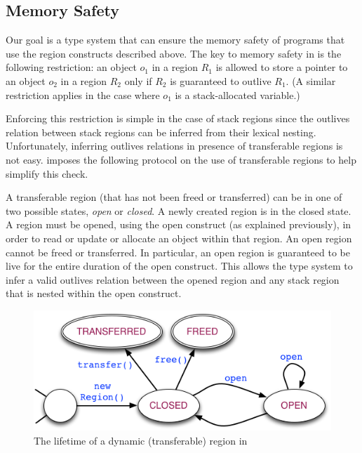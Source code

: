 \subsection{Memory Safety} \label{sec:memory-safety}

Our goal is a type system that can ensure the memory safety of
programs that use the region constructs described above.  The key to
memory safety in \name is the following restriction: an object $o_1$
in a region $R_1$ is allowed to store a pointer to an object $o_2$ in
a region $R_2$ only if $R_2$ is guaranteed to outlive $R_1$.  (A
similar restriction applies in the case where $o_1$ is a
stack-allocated variable.)

Enforcing this restriction is simple in the case of stack regions
since the outlives relation between stack regions can be inferred from
their lexical nesting. Unfortunately, inferring outlives relations
in presence of transferable regions is not easy.  \name imposes the following
protocol on the use of transferable regions to help simplify this
check.

A transferable region (that has not been freed or transferred) can be
in one of two possible states, \emph{open} or \emph{closed}. A newly
created region is in the closed state.  A region must be opened, using
the open construct (as explained previously), in order to read or
update or allocate an object within that region.  An open region
cannot be freed or transferred.  In particular, an open region is
guaranteed to be live for the entire duration of the open construct.
This allows the type system to infer a valid outlives relation between
the opened region and any stack region that is nested within the open
construct.

\begin{figure} 
\includegraphics[scale=0.45]{region-fsm.png}
\caption{The lifetime of a dynamic (transferable) region in \name}
\label{fig:region-fsm} 
\vspace*{-0.25in} 
\end{figure}

